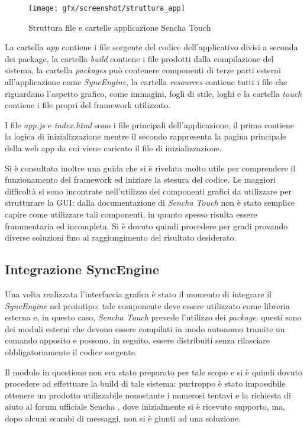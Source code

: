 \begin{figure}[htb]
\centering
\texttt{[image: gfx/screenshot/struttura\_app]}
\caption{Struttura file e cartelle applicazione Sencha Touch}
\label{fig:struttura app sencha touch}
\end{figure}

La cartella \emph{app} contiene i file sorgente del codice dell'applicativo divisi a seconda dei package, la cartella \emph{build} contiene i file prodotti dalla compilazione del sistema, la cartella \emph{packages} può contenere componenti di terze parti esterni all'applicazione come \emph{SyncEngine}, la cartella \emph{resources} contiene tutti i file che riguardano l'aspetto grafico, come immagini, fogli di stile, loghi e la cartella \emph{touch} contiene i file propri del framework utilizzato.

I file \emph{app.js} e \emph{index.html} sono i file principali dell'applicazione, il primo contiene la logica di inizializzazione mentre il secondo rappresenta la pagina principale della web app da cui viene caricato il file di inizializzazione.

Si è consultata inoltre una guida \cite{miamicoder:howto} che si è rivelata molto utile per comprendere il funzionamento del framework ed iniziare la stesura del codice.
Le maggiori difficoltà si sono incontrate nell'utilizzo dei componenti grafici da utilizzare per strutturare la \ac{GUI}: dalla documentazione di \emph{Sencha Touch} non è stato semplice capire come utilizzare tali componenti, in quanto spesso risulta essere frammentaria ed incompleta. Si è dovuto quindi procedere per gradi provando diverse soluzioni fino al raggiungimento del risultato desiderato.

\subsection{Integrazione SyncEngine}
Una volta realizzata l'interfaccia grafica è stato il momento di integrare il \emph{SyncEngine} nel prototipo: tale componente deve essere utilizzato come libreria esterna e, in questo caso, \emph{Sencha Touch} prevede l'utilizzo dei \emph{package}: questi sono dei moduli esterni che devono essere compilati in modo autonomo tramite un comando apposito e possono, in seguito, essere distribuiti senza rilasciare obbligatoriamente il codice sorgente.

Il modulo in questione non era stato preparato per tale scopo e si è quindi dovuto procedere ad effettuare la build di tale sistema: purtroppo è stato impossibile ottenere un prodotto utilizzabile nonostante i numerosi tentavi e la richiesta di aiuto al forum ufficiale Sencha \cite{sencha:buildingpackage}, dove inizialmente si è ricevuto supporto, ma, dopo alcuni scambi di messaggi, non si è giunti ad una soluzione.

